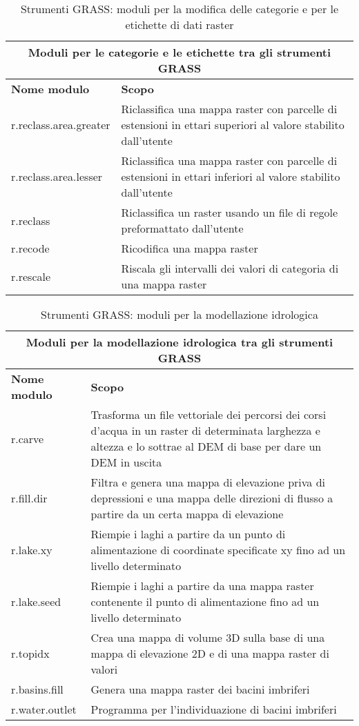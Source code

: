 \begin{table}[ht]
\centering
\caption{Strumenti GRASS: moduli per la modifica delle categorie e per le etichette di dati raster}\medskip
 \begin{tabular}{|p{4cm}|p{12cm}|}
  \hline \multicolumn{2}{|c|}{\textbf{Moduli per le categorie e le etichette tra gli strumenti GRASS}} \\
  \hline \textbf{Nome modulo} & \textbf{Scopo} \\
  \hline r.reclass.area.greater & Riclassifica una mappa raster con parcelle di estensioni in ettari superiori al valore stabilito dall'utente \\
  \hline r.reclass.area.lesser &  Riclassifica una mappa raster con parcelle di estensioni in ettari inferiori al valore stabilito dall'utente \\
  \hline r.reclass & Riclassifica un raster usando un file di regole preformattato dall'utente \\
  \hline r.recode & Ricodifica una mappa raster \\
  \hline r.rescale & Riscala gli intervalli dei valori di categoria di una mappa raster \\
\hline
\end{tabular}
\end{table}

\begin{table}[ht]
\centering
\caption{Strumenti GRASS: moduli per la modellazione idrologica}\medskip
 \begin{tabular}{|p{4cm}|p{12cm}|}
  \hline \multicolumn{2}{|c|}{\textbf{Moduli per la modellazione idrologica tra gli strumenti GRASS}} \\
  \hline \textbf{Nome modulo} & \textbf{Scopo} \\
  \hline r.carve & Trasforma un file vettoriale dei percorsi dei corsi d'acqua in un raster di determinata larghezza e altezza e lo sottrae al DEM di base per dare un DEM in uscita \\
  \hline r.fill.dir & Filtra e genera una mappa di elevazione priva di depressioni e una mappa delle direzioni di flusso a partire da un certa mappa di elevazione \\
  \hline r.lake.xy & Riempie i laghi a partire da un punto di alimentazione di coordinate specificate xy fino ad un livello determinato \\
  \hline r.lake.seed & Riempie i laghi a partire da una mappa raster contenente il punto di alimentazione fino ad un livello determinato \\
  \hline r.topidx & Crea una mappa di volume 3D sulla base di una mappa di elevazione 2D e di una mappa raster di valori \\
  \hline r.basins.fill & Genera una mappa raster dei bacini imbriferi \\
  \hline r.water.outlet & Programma per l'individuazione di bacini imbriferi \\
\hline
\end{tabular}
\end{table}

